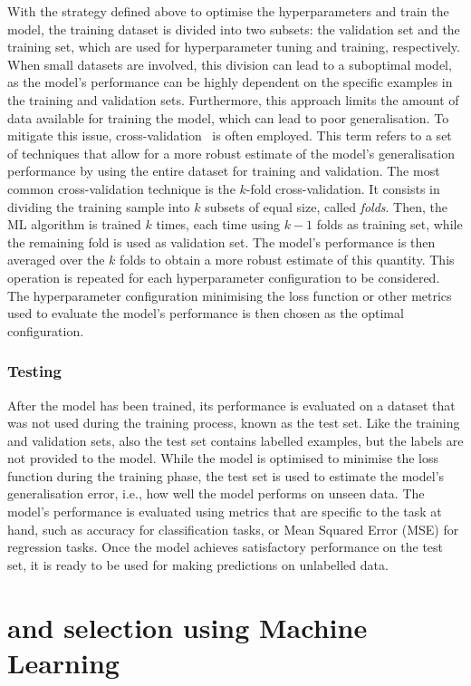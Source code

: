 With the strategy defined above to optimise the hyperparameters and train the model, the training dataset is divided into two subsets: the validation set and the training set, which are used for hyperparameter tuning and training, respectively. When small datasets are involved, this division can lead to a suboptimal model, as the model's performance can be highly dependent on the specific examples in the training and validation sets. Furthermore, this approach limits the amount of data available for training the model, which can lead to poor generalisation. To mitigate this issue, cross-validation~\cite{stone1974cross} is often employed. This term refers to a set of techniques that allow for a more robust estimate of the model's generalisation performance by using the entire dataset for training and validation. The most common cross-validation technique is the $k$-fold cross-validation. It consists in dividing the training sample into $k$ subsets of equal size, called \emph{folds}. Then, the ML algorithm is trained $k$ times, each time using $k-1$ folds as training set, while the remaining fold is used as validation set. The model's performance is then averaged over the $k$ folds to obtain a more robust estimate of this quantity. This operation is repeated for each hyperparameter configuration to be considered. The hyperparameter configuration minimising the loss function or other metrics used to evaluate the model's performance is then chosen as the optimal configuration.


\subsubsection{Testing}
After the model has been trained, its performance is evaluated on a dataset that was not used during the training process, known as the test set. Like the training and validation sets, also the test set contains labelled examples, but the labels are not provided to the model. While the model is optimised to minimise the loss function during the training phase, the test set is used to estimate the model's generalisation error, i.e., how well the model performs on unseen data. The model's performance is evaluated using metrics that are specific to the task at hand, such as accuracy for classification tasks, or Mean Squared Error (MSE) for regression tasks. Once the model achieves satisfactory performance on the test set, it is ready to be used for making predictions on unlabelled data.


\section{\texorpdfstring{\ds and \dpl selection using Machine Learning}{Ds+ and D+ selection using Machine Learning}}

